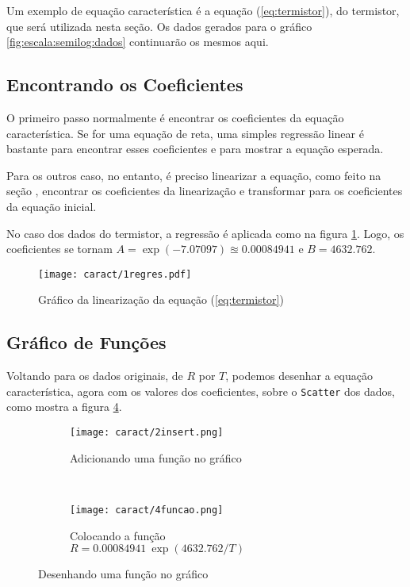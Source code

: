 Um exemplo de equação característica é a equação (\ref{eq:termistor}), do termistor, que será utilizada nesta seção. Os dados gerados para o gráfico \ref{fig:escala:semilog:dados} continuarão os mesmos aqui.

\subsection{Encontrando os Coeficientes}

    O primeiro passo normalmente é encontrar os coeficientes da equação característica. Se for uma equação de reta, uma simples regressão linear é bastante para encontrar esses coeficientes e para mostrar a equação esperada.

    Para os outros caso, no entanto, é preciso linearizar a equação, como feito na seção , encontrar os coeficientes da linearização e transformar para os coeficientes da equação inicial.

    No caso dos dados do termistor, a regressão é aplicada como na figura \ref{fig:caract:regres}. Logo, os coeficientes se tornam $A = \exp(-7.07097) \approxeq 0.00084941$ e $B = 4632.762$.

    \begin{figure}[htbp]
        \centering
        \texttt{[image: caract/1regres.pdf]}

        \caption{Gráfico da linearização da equação (\ref{eq:termistor})}
        \label{fig:caract:regres}
    \end{figure}


    \subsection{Gráfico de Funções}

    Voltando para os dados originais, de $R$ por $T$, podemos desenhar a equação característica, agora com os valores dos coeficientes, sobre o \texttt{Scatter} dos dados, como mostra a figura \ref{fig:caract:inserir}.

    \begin{figure}[htbp]
        \centering
        \begin{subfigure}{0.32\textwidth}
            \centering
            \texttt{[image: caract/2insert.png]}

            \caption{Adicionando uma função no gráfico}
            \label{fig:caract:novo}
        \end{subfigure}
        ~
        \begin{subfigure}{0.63\textwidth}
            \centering
            \texttt{[image: caract/4funcao.png]}

            \caption{Colocando a função $R = 0.00084941 ~ \exp(4632.762/T)$}
            \label{fig:caract:funcao}
        \end{subfigure}
        \caption{Desenhando uma função no gráfico}
        \label{fig:caract:inserir}
    \end{figure}


